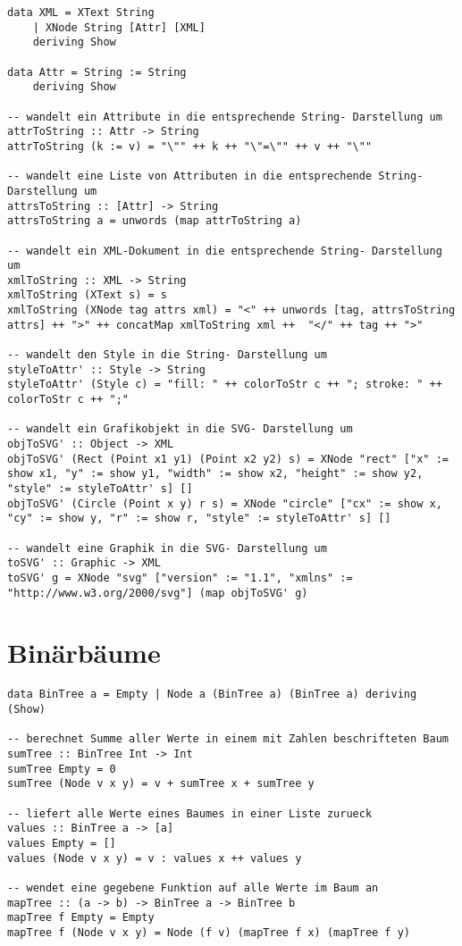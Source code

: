 \documentclass[a4paper]{article}
\begin{document}
\begin{lstlisting}
data XML = XText String
    | XNode String [Attr] [XML]
    deriving Show

data Attr = String := String
    deriving Show

-- wandelt ein Attribute in die entsprechende String- Darstellung um
attrToString :: Attr -> String
attrToString (k := v) = "\"" ++ k ++ "\"=\"" ++ v ++ "\""

-- wandelt eine Liste von Attributen in die entsprechende String- Darstellung um
attrsToString :: [Attr] -> String
attrsToString a = unwords (map attrToString a)  

-- wandelt ein XML-Dokument in die entsprechende String- Darstellung um
xmlToString :: XML -> String
xmlToString (XText s) = s
xmlToString (XNode tag attrs xml) = "<" ++ unwords [tag, attrsToString attrs] ++ ">" ++ concatMap xmlToString xml ++  "</" ++ tag ++ ">" 

-- wandelt den Style in die String- Darstellung um
styleToAttr' :: Style -> String
styleToAttr' (Style c) = "fill: " ++ colorToStr c ++ "; stroke: " ++ colorToStr c ++ ";"

-- wandelt ein Grafikobjekt in die SVG- Darstellung um
objToSVG' :: Object -> XML
objToSVG' (Rect (Point x1 y1) (Point x2 y2) s) = XNode "rect" ["x" := show x1, "y" := show y1, "width" := show x2, "height" := show y2, "style" := styleToAttr' s] []
objToSVG' (Circle (Point x y) r s) = XNode "circle" ["cx" := show x, "cy" := show y, "r" := show r, "style" := styleToAttr' s] []

-- wandelt eine Graphik in die SVG- Darstellung um
toSVG' :: Graphic -> XML
toSVG' g = XNode "svg" ["version" := "1.1", "xmlns" := "http://www.w3.org/2000/svg"] (map objToSVG' g) 
\end{lstlisting}

\section{Binärbäume}

\begin{lstlisting}
data BinTree a = Empty | Node a (BinTree a) (BinTree a) deriving (Show)  

-- berechnet Summe aller Werte in einem mit Zahlen beschrifteten Baum 
sumTree :: BinTree Int -> Int
sumTree Empty = 0
sumTree (Node v x y) = v + sumTree x + sumTree y

-- liefert alle Werte eines Baumes in einer Liste zurueck
values :: BinTree a -> [a]
values Empty = []
values (Node v x y) = v : values x ++ values y

-- wendet eine gegebene Funktion auf alle Werte im Baum an
mapTree :: (a -> b) -> BinTree a -> BinTree b
mapTree f Empty = Empty
mapTree f (Node v x y) = Node (f v) (mapTree f x) (mapTree f y) 
\end{lstlisting}
\end{document}
